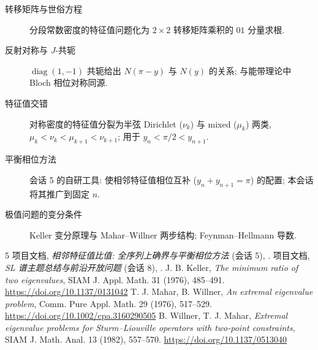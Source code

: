 \documentclass[UTF8]{ctexart}
\begin{document}
\begin{description}
	\item[转移矩阵与世俗方程] 分段常数密度的特征值问题化为 $2\times2$
		转移矩阵乘积的 $01$ 分量求根.
	\item[反射对称与 $J$-共轭] $\operatorname{diag}(1,-1)$ 共轭给出
		$N(\pi-y)$ 与 $N(y)$ 的关系; 与能带理论中 Bloch 相位对称同源.
	\item[特征值交错] 对称密度的特征值分裂为半弦 Dirichlet ($\nu_k$) 与
		mixed ($\mu_k$) 两类, $\mu_k < \nu_k < \mu_{k+1} < \nu_{k+1}$;
		用于 $y_n < \pi/2 < y_{n+1}$.
	\item[平衡相位方法] 会话 5 的自研工具: 使相邻特征值相位互补
		($y_n + y_{n+1} = \pi$) 的配置; 本会话将其推广到固定 $n$.
	\item[极值问题的变分条件] Keller 变分原理与 Mahar--Willner 两步结构;
		Feynman--Hellmann 导数.
\end{description}

\begin{thebibliography}{5}
 项目文档, \emph{相邻特征值比值: 全序列上确界与平衡相位方法}
	(会话 5), .
 项目文档, \emph{SL 谱主题总结与前沿开放问题} (会话 8),
	.
 J. B. Keller, \emph{The minimum ratio of two eigenvalues},
	SIAM J. Appl. Math. 31 (1976), 485--491. \url{https://doi.org/10.1137/0131042}
 T. J. Mahar, B. Willner, \emph{An extremal eigenvalue problem},
	Comm. Pure Appl. Math. 29 (1976), 517--529.
	\url{https://doi.org/10.1002/cpa.3160290505}
 B. Willner, T. J. Mahar, \emph{Extremal eigenvalue problems for
	Sturm--Liouville operators with two-point constraints}, SIAM J. Math. Anal.
	13 (1982), 557--570. \url{https://doi.org/10.1137/0513040}
\end{thebibliography}
\end{document}
